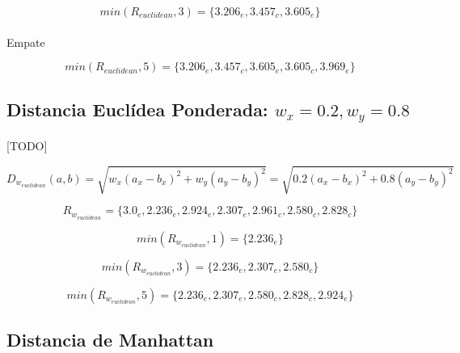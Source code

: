 \documentclass{article}
\begin{document}
			\begin{equation}
				min(R_{euclidean},3) = \{ 3.206_e, 3.457_c, 3.605_e\}
			\end{equation}

			\paragraph{}
			Empate

			\begin{equation}
				min(R_{euclidean},5) = \{ 3.206_e, 3.457_c, 3.605_e, 3.605_c,  3.969_e \}
			\end{equation}

		\subsection{Distancia Euclídea Ponderada: $w_x=0.2, w_y=0.8$}

			\paragraph{}
			[TODO]

			\begin{equation}
				D_{w_{euclidean}}(a,b) = \sqrt{w_x(a_x - b_x)^2 + w_y(a_y - b_y)^2} = \sqrt{0.2(a_x - b_x)^2 + 0.8(a_y - b_y)^2}
			\end{equation}

			\begin{equation}
				R_{w_{euclidean}} = \{3.0_e, 2.236_e, 2.924_e, 2.307_e, 2.961_c, 2.580_c, 2.828_c\}
			\end{equation}

			\begin{equation}
				min(R_{w_{euclidean}},1) = \{ 2.236_e \}
			\end{equation}

			\begin{equation}
				min(R_{w_{euclidean}},3) = \{ 2.236_e, 2.307_e, 2.580_c\}
			\end{equation}

			\begin{equation}
				min(R_{w_{euclidean}},5) = \{ 2.236_e, 2.307_e, 2.580_c, 2.828_c, 2.924_e\}
			\end{equation}


		\subsection{Distancia de Manhattan}
\end{document}
